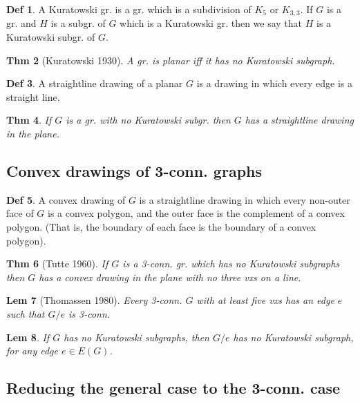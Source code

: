 \documentclass[11pt, fleqn, a4paper, landscape]{article}
\theoremstyle{plain} %
\newtheorem{thm}{Thm}
\newtheorem{lem}[thm]{Lem}
\theoremstyle{remark} %
\theoremstyle{definition} %
\newtheorem{defi}[thm]{Def}
\begin{document}
\begin{multicols}{5}
\begin{defi}
A Kuratowski gr. is a gr. which is a subdivision of $K_5$ or $K_{3,3}$. If $G$ is a gr. and $H$ is a subgr. of $G$ which is a Kuratowski gr. then we say that $H$ is a Kuratowski subgr. of $G$.
\end{defi}

\begin{thm}[Kuratowski 1930]
A gr. is planar iff it has no Kuratowski subgraph.
\end{thm}

\begin{defi}
A straightline drawing of a planar $G$ is a drawing in which every edge is a straight line.
\end{defi}

\begin{thm}
If $G$ is a gr. with no Kuratowski subgr. then $G$ has a straightline drawing in the plane.
\end{thm}

\subsection{Convex drawings of 3-conn. graphs}

\begin{defi}
A convex drawing of $G$ is a straightline drawing in which every non-outer face of $G$ is a convex polygon, and the outer face is the complement of a convex polygon. (That is, the boundary of each face is the boundary of a convex polygon).
\end{defi}

\begin{thm}[Tutte 1960]
If $G$ is a 3-conn. gr. which has no Kuratowski subgraphs then
$G$ has a convex drawing in the plane with no three vxs on a line.
\end{thm}

\begin{lem}[Thomassen 1980]
Every 3-conn. $G$ with at least five vxs has an edge
$e$ such that $G\slash e$ is 3-conn.
\end{lem}

\begin{lem}
If $G$ has no Kuratowski subgraphs, then $G\slash e$ has no Kuratowski subgraph, for any edge $e\in E(G)$.
\end{lem}

\subsection{Reducing the general case to the 3-conn. case}


\end{multicols}
\end{document}
